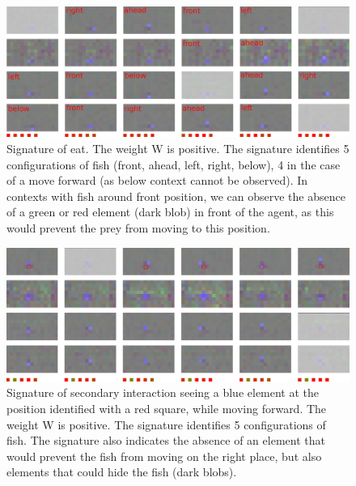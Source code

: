 \documentclass[conference]{IEEEtran}
\begin{document}
\begin{figure}[t]
\centerline{\includegraphics[scale=0.32]{img/sig_eat.pdf}}
\caption{Signature of eat. The weight W is positive. %
The signature identifies 5 configurations of fish (front, ahead, left, right, below), 4 in the case of a move forward (as below context cannot be observed). In contexts with fish around front position, we can observe the absence of a green or red element (dark blob) in front of the agent, as this would prevent the prey from moving to this position.}
\label{fig:eat}
\end{figure}

\begin{figure}[t]
\centerline{\includegraphics[scale=0.32]{img/sig_blue.pdf}}
\caption{Signature of secondary interaction seeing a blue element at the position identified with a red square, while moving forward. The weight W is positive. The signature identifies 5 configurations of fish. The signature also indicates the absence of an element that would prevent the fish from moving on the right place, but also elements that could hide the fish (dark blobs).}
\label{fig:sigblue}
\end{figure}



\end{document}
